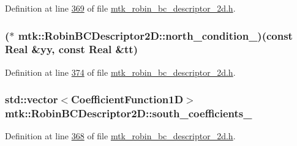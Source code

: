 Definition at line \hyperlink{mtk__robin__bc__descriptor__2d_8h_source_l00369}{369} of file \hyperlink{mtk__robin__bc__descriptor__2d_8h_source}{mtk\+\_\+robin\+\_\+bc\+\_\+descriptor\+\_\+2d.\+h}.

\hypertarget{classmtk_1_1RobinBCDescriptor2D_ad2a1e821b0c6d226a8b884baadcf1f1b}{
\subsubsection[{north\+\_\+condition\+\_\+}]{($\ast$ mtk\+::\+Robin\+B\+C\+Descriptor2\+D\+::north\+\_\+condition\+\_\+)(const {\bf Real} \&yy, const {\bf Real} \&tt)\hspace{0.3cm}{\ttfamily [private]}}}\label{classmtk_1_1RobinBCDescriptor2D_ad2a1e821b0c6d226a8b884baadcf1f1b}


Definition at line \hyperlink{mtk__robin__bc__descriptor__2d_8h_source_l00374}{374} of file \hyperlink{mtk__robin__bc__descriptor__2d_8h_source}{mtk\+\_\+robin\+\_\+bc\+\_\+descriptor\+\_\+2d.\+h}.

\hypertarget{classmtk_1_1RobinBCDescriptor2D_a97335ce1103cb89ab0696d5ae2fc6d37}{
\subsubsection[{south\+\_\+coefficients\+\_\+}]{\setlength{\rightskip}{0pt plus 5cm}std\+::vector$<${\bf Coefficient\+Function1\+D}$>$ mtk\+::\+Robin\+B\+C\+Descriptor2\+D\+::south\+\_\+coefficients\+\_\+\hspace{0.3cm}{\ttfamily [private]}}}\label{classmtk_1_1RobinBCDescriptor2D_a97335ce1103cb89ab0696d5ae2fc6d37}


Definition at line \hyperlink{mtk__robin__bc__descriptor__2d_8h_source_l00368}{368} of file \hyperlink{mtk__robin__bc__descriptor__2d_8h_source}{mtk\+\_\+robin\+\_\+bc\+\_\+descriptor\+\_\+2d.\+h}.

